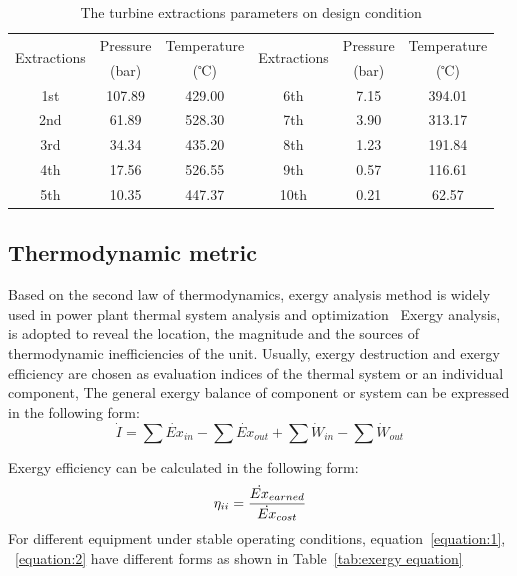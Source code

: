 \documentclass[preprint,12pt]{elsarticle}
\begin{document}
\begin{table}
\caption{The turbine extractions parameters on design condition}
\label{table:extractions_parameter}
\begin{centering}
\begin{tabular}{cccccc}
\toprule 
\multirow{2}{*}{Extractions} & Pressure & Temperature & \multirow{2}{*}{Extractions} & Pressure & Temperature\tabularnewline
 & (bar) & (℃) &  & (bar) & (℃)\tabularnewline
\midrule
1st & 107.89  & 429.00 & 6th & 7.15  & 394.01 \tabularnewline
2nd & 61.89 & 528.30  & 7th & 3.90  & 313.17\tabularnewline
3rd & 34.34 & 435.20  & 8th & 1.23  & 191.84\tabularnewline
4th & 17.56  & 526.55  & 9th & 0.57  & 116.61\tabularnewline
5th & 10.35  & 447.37 & 10th & 0.21 & 62.57\tabularnewline
\bottomrule
\end{tabular}
\par\end{centering}
\end{table}

\subsection{Thermodynamic metric} %
\label{ssub3:analsys method} 
Based on the second law of thermodynamics, exergy analysis method is widely used in power plant thermal system analysis and optimization~\cite{Si2017Exergy,Yang2013Comprehensive,Ahmadi2016Energy}
Exergy analysis, is adopted to reveal the location, the magnitude and the sources of thermodynamic inefficiencies of the unit.
Usually, exergy destruction and exergy efficiency are chosen as evaluation indices of the thermal system or an individual component, 
The general exergy balance of component or system can be expressed in the following form:
\begin{equation}
\label{equation:1}
\dot{I}=\sum\dot{Ex}{}_{in}-\sum\dot{Ex}{}_{out}+\sum\dot{W}{}_{in}-\sum\dot{W}{}_{out}
\end{equation}





Exergy efficiency can be calculated in the following form:
\begin{equation}
\label{equation:2}
\eta_{\uppercase\expandafter{\romannumeral2}}=\frac{\dot{Ex}{}_{earned}}{\dot{Ex}{}_{cost}}
\end{equation}
For different equipment under stable operating conditions, equation~\ref{equation:1}, ~\ref{equation:2} have different forms as shown in Table~\ref{tab:exergy equation}~\cite{Aljundi2009Energy}
\end{document}
